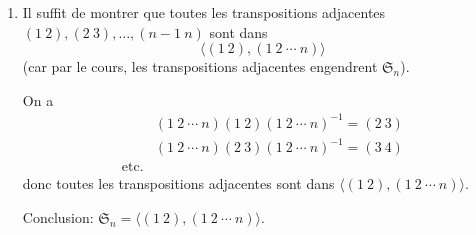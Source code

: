 {\begin{td-sol}[]
\begin{enumerate}
            Conclusion: on a \(\forall j\in\{1,\ldots,n\}, \alpha(j) = \beta(j)\) donc \(\alpha = \beta\).

            \begin{remark}[Ca sort d'où?]
                Soient deux ensembles \(E\) et \(F\) de cardinal fini \(n\).
                Soit \(\sigma\colon E\to F\) une bijection. 

                Soit \(f\in \text{Bij}(E)\). Alors, \(\sigma f \sigma^{-1}\) est une bijection de \(F\).

                Slogan: ``\(\sigma f \sigma^{-1}\), c'est comme \(f\), après avoir renommé les éléments''.

                En effet, notons \(E = \{x_1,\ldots,x_n\}\) et \(F = \{y_1,\ldots,y_n\}\) avec \(\sigma(x_i) = y_i\).

                Si \(f(x_i) = x_j\) alors
                \begin{equation*}
                    (\sigma f \sigma^{-1})(y_i) = (\sigma f)(x_i) = \sigma(f(x_i)) = \sigma(x_j) = y_j
                \end{equation*}
                et
                \begin{equation*}
                    (\sigma f \sigma^{-1})(y_i) = y_j
                \end{equation*}
            \end{remark}

            \item Il suffit de montrer que toutes les transpositions adjacentes 
            \((1~2), (2~3), \ldots, (n-1~n)\) sont dans
            \begin{equation*}
                \langle (1~2), (1~2~\cdots~n)\rangle
            \end{equation*}
            (car par le cours, les transpositions adjacentes engendrent \(\mathfrak{S}_n\)).

            On a
            \begin{equation*}
                \begin{aligned}
                    &(1~2~\cdots~n)(1~2){(1~2~\cdots~n)}^{-1} = (2~3)\\
                    &(1~2~\cdots~n)(2~3){(1~2~\cdots~n)}^{-1} = (3~4)\\
                    \text{etc.}
                \end{aligned}
            \end{equation*}
            donc toutes les transpositions adjacentes sont dans \(\langle (1~2), (1~2~\cdots~n)\rangle\).

            Conclusion: \(\mathfrak{S}_n = \langle (1~2), (1~2~\cdots~n)\rangle\).
        \end{enumerate}
    \end{td-sol}
}{}

